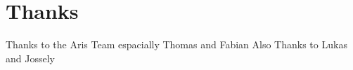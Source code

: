 
\section{Thanks}
Thanks to the Aris Team espacially Thomas and Fabian
Also Thanks to Lukas and Jossely

